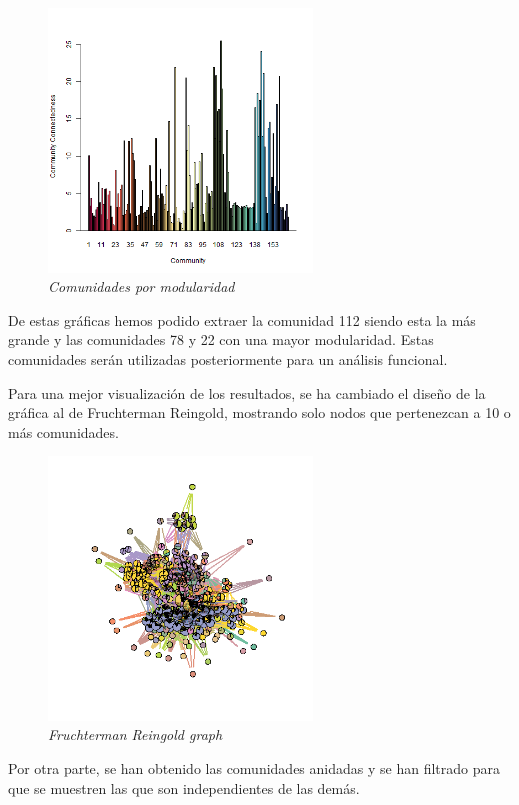 \begin{figure}
	\centering
	\includegraphics[width=70mm,scale=1.2]{figures/clusters_modularity.png}
	\caption{\textit{Comunidades por modularidad}}
\end{figure}

De estas gráficas hemos podido extraer la comunidad 112 siendo esta la más grande y las comunidades 78 y 22 con una mayor modularidad. Estas comunidades serán utilizadas posteriormente para un análisis funcional.

Para una mejor visualización de los resultados, se ha cambiado el diseño de la gráfica al de Fruchterman Reingold, mostrando solo nodos que pertenezcan a 10 o más comunidades.

\begin{figure}
	\centering
	\includegraphics[width=70mm,scale=1.2]{figures/hits.network_layout_fruchterman.reingold_shownodesin_10.png}
	\caption{\textit{Fruchterman Reingold graph}}
\end{figure}

Por otra parte, se han obtenido las comunidades anidadas y se han filtrado para que se muestren las que son independientes de las demás.

